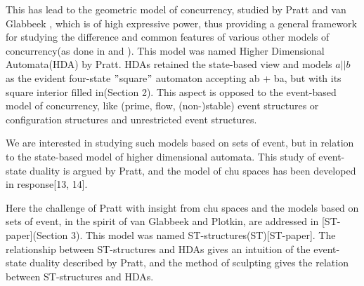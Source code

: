 \documentclass[9pt, english, a4paper]{article}
\theoremstyle{definition}
\begin{document}
	This has lead to the geometric model of concurrency, studied by Pratt and van Glabbeek \cite{pratt1991, pratt2000, glab2006}, which is of high expressive power, thus providing a general framework for studying the difference and common features of various other models of concurrency(as done in \cite{glab2006} and \cite{goub2012}). This model was named Higher Dimensional Automata(HDA) by Pratt\cite{pratt1991}. HDAs retained the state-based view and models $a||b$ as the evident four-state $"$square$"$ automaton accepting ab + ba, but with its square interior filled in(Section 2). This aspect is opposed to the event-based model of concurrency, like (prime, flow, (non-)stable) event structures\cite{winsk1979, winsk1986,castell1989} or configuration structures and unrestricted event structures\cite{glab1995, glab2009}.



	We are interested in studying such models based on sets of event, but in relation to the state-based model of higher dimensional automata. This study of event-state duality is argued by Pratt\cite{pratt2002}, and the model of chu spaces has been developed in response[13, 14].

	Here the challenge of Pratt with insight from chu spaces and the models based on sets of event, in the spirit of van Glabbeek and Plotkin\cite{glab2009}, are addressed in [ST-paper](Section 3). This model was named ST-structures(ST)[ST-paper]. The relationship between ST-structures and HDAs gives an intuition of the event-state duality described by Pratt, and the method of sculpting gives the relation between ST-structures and HDAs.
\end{document}

